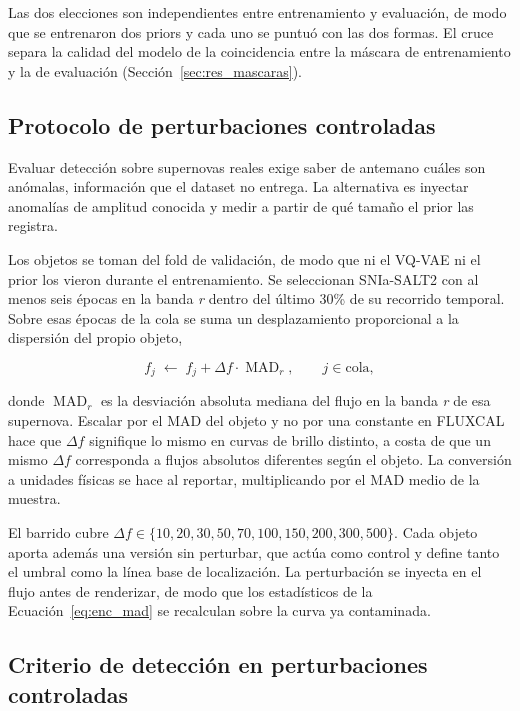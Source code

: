 Las dos elecciones son independientes entre entrenamiento y evaluación, de modo que se entrenaron dos priors y cada uno se puntuó con las dos formas. El cruce separa la calidad del modelo de la coincidencia entre la máscara de entrenamiento y la de evaluación (Sección~\ref{sec:res_mascaras}).

\subsection{Protocolo de perturbaciones controladas}
\label{sec:protocolo_sintetico}

Evaluar detección sobre supernovas reales exige saber de antemano cuáles son anómalas, información que el dataset no entrega. La alternativa es inyectar anomalías de amplitud conocida y medir a partir de qué tamaño el prior las registra.

Los objetos se toman del fold de validación, de modo que ni el VQ-VAE ni el prior los vieron durante el entrenamiento. Se seleccionan SNIa-SALT2 con al menos seis épocas en la banda \textit{r} dentro del último 30\% de su recorrido temporal. Sobre esas épocas de la cola se suma un desplazamiento proporcional a la dispersión del propio objeto,

\begin{equation}
f_j \;\longleftarrow\; f_j + \Delta f \cdot \operatorname{MAD}_r,
\qquad j \in \text{cola},
\label{eq:inyeccion}
\end{equation}

donde $\operatorname{MAD}_r$ es la desviación absoluta mediana del flujo en la banda \textit{r} de esa supernova. Escalar por el MAD del objeto y no por una constante en FLUXCAL hace que $\Delta f$ signifique lo mismo en curvas de brillo distinto, a costa de que un mismo $\Delta f$ corresponda a flujos absolutos diferentes según el objeto. La conversión a unidades físicas se hace al reportar, multiplicando por el MAD medio de la muestra.

El barrido cubre $\Delta f \in \{10, 20, 30, 50, 70, 100, 150, 200, 300, 500\}$. Cada objeto aporta además una versión sin perturbar, que actúa como control y define tanto el umbral como la línea base de localización. La perturbación se inyecta en el flujo antes de renderizar, de modo que los estadísticos de la Ecuación~\ref{eq:enc_mad} se recalculan sobre la curva ya contaminada.

\subsection{Criterio de detección en perturbaciones controladas}

